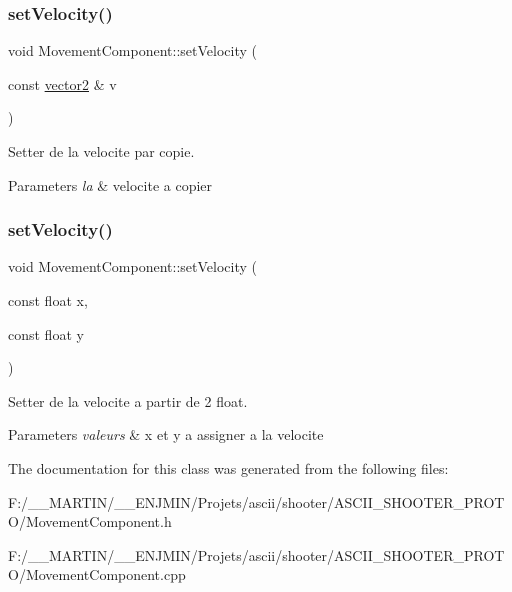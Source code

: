 \subsubsection{\texorpdfstring{set\+Velocity()}{setVelocity()}\hspace{0.1cm}{\footnotesize\ttfamily [1/2]}}
{\footnotesize\ttfamily void Movement\+Component\+::set\+Velocity (\begin{DoxyParamCaption}\item[{const \hyperlink{structvector2}{vector2} \&}]{v }\end{DoxyParamCaption})\hspace{0.3cm}{\ttfamily [inline]}}



Setter de la velocite par copie. 


\begin{DoxyParams}{Parameters}
{\em la} & velocite a copier \\
\hline
\end{DoxyParams}
\hypertarget{class_movement_component_add7629692ed68862ff1fd1f3515e2ea6}{}\label{class_movement_component_add7629692ed68862ff1fd1f3515e2ea6} 
\subsubsection{\texorpdfstring{set\+Velocity()}{setVelocity()}\hspace{0.1cm}{\footnotesize\ttfamily [2/2]}}
{\footnotesize\ttfamily void Movement\+Component\+::set\+Velocity (\begin{DoxyParamCaption}\item[{const float}]{x,  }\item[{const float}]{y }\end{DoxyParamCaption})\hspace{0.3cm}{\ttfamily [inline]}}



Setter de la velocite a partir de 2 float. 


\begin{DoxyParams}{Parameters}
{\em valeurs} & x et y a assigner a la velocite \\
\hline
\end{DoxyParams}


The documentation for this class was generated from the following files\+:\begin{DoxyCompactItemize}
\item 
F\+:/\+\_\+\+\_\+\+M\+A\+R\+T\+I\+N/\+\_\+\+\_\+\+E\+N\+J\+M\+I\+N/\+Projets/ascii/shooter/\+A\+S\+C\+I\+I\+\_\+\+S\+H\+O\+O\+T\+E\+R\+\_\+\+P\+R\+O\+T\+O/Movement\+Component.\+h\item 
F\+:/\+\_\+\+\_\+\+M\+A\+R\+T\+I\+N/\+\_\+\+\_\+\+E\+N\+J\+M\+I\+N/\+Projets/ascii/shooter/\+A\+S\+C\+I\+I\+\_\+\+S\+H\+O\+O\+T\+E\+R\+\_\+\+P\+R\+O\+T\+O/Movement\+Component.\+cpp\end{DoxyCompactItemize}
